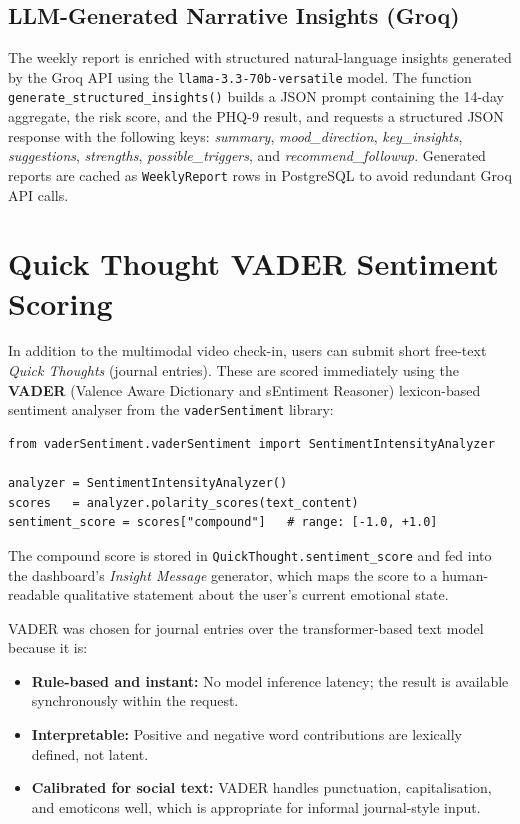 \documentclass[12pt,a4paper]{article}
\begin{document}
\subsection{LLM-Generated Narrative Insights (Groq)}

The weekly report is enriched with structured natural-language insights
generated by the Groq API using the \texttt{llama-3.3-70b-versatile} model.
The function \texttt{generate\_structured\_insights()} builds a JSON prompt
containing the 14-day aggregate, the risk score, and the PHQ-9 result, and
requests a structured JSON response with the following keys:
\textit{summary}, \textit{mood\_direction}, \textit{key\_insights},
\textit{suggestions}, \textit{strengths}, \textit{possible\_triggers}, and
\textit{recommend\_followup}. Generated reports are cached as
\texttt{WeeklyReport} rows in PostgreSQL to avoid redundant Groq API calls.

\section{Quick Thought VADER Sentiment Scoring}
\label{sec:sentiment}

In addition to the multimodal video check-in, users can submit short
free-text \textit{Quick Thoughts} (journal entries). These are scored
immediately using the \textbf{VADER} (Valence Aware Dictionary and sEntiment
Reasoner) lexicon-based sentiment analyser from the
\texttt{vaderSentiment} library:

\begin{lstlisting}[caption={VADER sentiment scoring for journal entries.}]
from vaderSentiment.vaderSentiment import SentimentIntensityAnalyzer

analyzer = SentimentIntensityAnalyzer()
scores   = analyzer.polarity_scores(text_content)
sentiment_score = scores["compound"]   # range: [-1.0, +1.0]
\end{lstlisting}

The compound score is stored in \texttt{QuickThought.sentiment\_score} and
fed into the dashboard's \textit{Insight Message} generator, which maps the
score to a human-readable qualitative statement about the user's current
emotional state.

VADER was chosen for journal entries over the transformer-based text model
because it is:
\begin{itemize}[leftmargin=1.5em]
  \item \textbf{Rule-based and instant:} No model inference latency; the
        result is available synchronously within the request.
  \item \textbf{Interpretable:} Positive and negative word contributions are
        lexically defined, not latent.
  \item \textbf{Calibrated for social text:} VADER handles punctuation,
        capitalisation, and emoticons well, which is appropriate for
        informal journal-style input.
\end{itemize}
\end{document}
